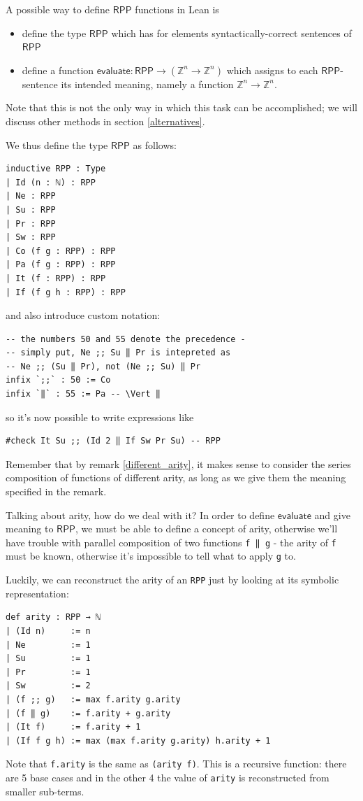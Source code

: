 \documentclass[oneside]{book}
\theoremstyle{definition}
\theoremstyle{remark}
\theoremstyle{plain}
\newcommand{\ZZ}{\mathbb{Z}}
\newcommand{\RPP}{\mathsf{RPP}}
\begin{document}
A possible way to define $\RPP$ functions in Lean is
\begin{itemize}
\item define the type $\RPP$ which has for elements syntactically-correct sentences of $\RPP$
\item define a function $\mathsf{evaluate} : \RPP \to (\ZZ^n \to \ZZ^n)$ which assigns to each $\RPP$-sentence its intended meaning,
namely a function $\ZZ^n \to \ZZ^n$.
\end{itemize}
Note that this is not the only way in which this task can be accomplished;
we will discuss other methods in section \ref{alternatives}.

We thus define the type $\RPP$ as follows:
\begin{lstlisting}
inductive RPP : Type
| Id (n : ℕ) : RPP
| Ne : RPP
| Su : RPP
| Pr : RPP
| Sw : RPP
| Co (f g : RPP) : RPP
| Pa (f g : RPP) : RPP
| It (f : RPP) : RPP
| If (f g h : RPP) : RPP
\end{lstlisting}
and also introduce custom notation:
\begin{lstlisting}
-- the numbers 50 and 55 denote the precedence -
-- simply put, Ne ;; Su ‖ Pr is intepreted as
-- Ne ;; (Su ‖ Pr), not (Ne ;; Su) ‖ Pr
infix `;;` : 50 := Co
infix `‖` : 55 := Pa -- \Vert ‖
\end{lstlisting}
so it's now possible to write expressions like
\begin{lstlisting}
#check It Su ;; (Id 2 ‖ If Sw Pr Su) -- RPP
\end{lstlisting}
Remember that by remark \ref{different_arity}, it makes sense to consider the series composition of functions of different arity,
as long as we give them the meaning specified in the remark.

Talking about arity, how do we deal with it?
In order to define $\mathsf{evaluate}$ and give meaning to $\RPP$,
we must be able to define a concept of arity,
otherwise we'll have trouble with parallel composition of two functions \lstinline{f ‖ g} -
the arity of \lstinline{f} must be known,
otherwise it's impossible to tell what to apply \lstinline{g} to.

Luckily, we can reconstruct the arity of an \lstinline{RPP} just by looking at its symbolic representation:
\begin{lstlisting}
def arity : RPP → ℕ
| (Id n)     := n
| Ne         := 1
| Su         := 1
| Pr         := 1
| Sw         := 2
| (f ;; g)   := max f.arity g.arity
| (f ‖ g)    := f.arity + g.arity
| (It f)     := f.arity + 1
| (If f g h) := max (max f.arity g.arity) h.arity + 1
\end{lstlisting}
Note that \lstinline{f.arity} is the same as \lstinline{(arity f)}.
This is a recursive function:
there are 5 base cases and in the other 4 the value of \lstinline{arity} is reconstructed from smaller sub-terms.
\end{document}
